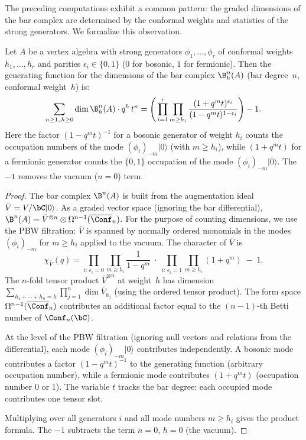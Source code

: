 The preceding computations exhibit a common pattern: the graded
dimensions of the bar complex are determined by the
conformal weights and statistics of the strong generators.
We formalize this observation.

\begin{proposition}
\label{prop:universal-dim-formula}
Let $A$ be a vertex algebra with strong generators
$\phi_1, \ldots, \phi_r$ of conformal weights $h_1, \ldots, h_r$
and parities $\epsilon_i \in \{0, 1\}$ ($0$ for bosonic, $1$ for
fermionic).  Then the generating function for the dimensions of the
bar complex $\B^n_h(A)$ (bar degree~$n$, conformal weight~$h$) is:
\begin{equation}\label{eq:universal-dim}
\sum_{n \geq 1,\, h \geq 0} \dim \B^n_h(A) \cdot q^h \, t^n
= \Biggl(\,\prod_{i=1}^{r}
  \prod_{m \geq h_i}
  \frac{(1 + q^m t)^{\epsilon_i}}{(1 - q^m t)^{1-\epsilon_i}}
\Biggr) - 1.
\end{equation}
Here the factor $(1 - q^m t)^{-1}$ for a bosonic generator
of weight $h_i$ counts the occupation numbers of the mode
$(\phi_i)_{-m}|0\rangle$ (with $m \geq h_i$), while
$(1 + q^m t)$ for a fermionic generator counts the $\{0,1\}$
occupation of the mode $(\phi_i)_{-m}|0\rangle$.
The $-1$ removes the vacuum ($n = 0$) term.
\end{proposition}

\begin{proof}
The bar complex $\B^n(A)$ is built from the augmentation ideal
$\bar{V} = V / \bC|0\rangle$.  As a graded vector space (ignoring
the bar differential), $\B^n(A) = \bar{V}^{\otimes n} \otimes
\Omega^{n-1}(\overline{\Conf}_n)$.  For the purpose of
counting dimensions, we use the PBW filtration: $\bar{V}$ is
spanned by normally ordered monomials in the modes
$(\phi_i)_{-m}$ for $m \geq h_i$ applied to the vacuum.
The character of $\bar{V}$ is
\[
\chi_{\bar{V}}(q) = \prod_{i:\,\epsilon_i = 0}
  \prod_{m \geq h_i} \frac{1}{1 - q^m}
\;\cdot\; \prod_{i:\,\epsilon_i = 1}
  \prod_{m \geq h_i} (1 + q^m) \;-\; 1.
\]
The $n$-fold tensor product $\bar{V}^{\otimes n}$ at weight~$h$
has dimension $\sum_{h_1 + \cdots + h_n = h}
\prod_{j=1}^n \dim \bar{V}_{h_j}$ (using the ordered tensor product).
The form space $\Omega^{n-1}(\overline{\Conf}_n)$ contributes
an additional factor equal to the $(n-1)$-th Betti number of
$\Conf_n(\bC)$.

At the level of the PBW filtration (ignoring null vectors and
relations from the differential), each mode
$(\phi_i)_{-m}|0\rangle$ contributes independently.
A bosonic mode contributes a factor $(1 - q^m t)^{-1}$
to the generating function (arbitrary occupation number), while
a fermionic mode contributes $(1 + q^m t)$
(occupation number $0$ or $1$).  The variable $t$ tracks the
bar degree: each occupied mode contributes one tensor slot.

Multiplying over all generators $i$ and all mode numbers $m \geq h_i$
gives the product formula.  The $-1$ subtracts the term
$n = 0$, $h = 0$ (the vacuum).
\end{proof}

